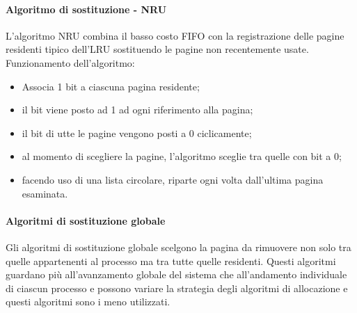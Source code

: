 \documentclass[12pt, letterpaper]{report}
\begin{document}
	\paragraph{Algoritmo di sostituzione - NRU} L'algoritmo NRU combina il basso costo FIFO con la registrazione delle pagine residenti tipico dell'LRU sostituendo le pagine non recentemente usate. \\
	Funzionamento dell'algoritmo:
	\begin{itemize}
		\item Associa 1 bit a ciascuna pagina residente;
		\item il bit viene posto ad 1 ad ogni riferimento alla pagina;
		\item il bit di utte le pagine vengono posti a 0 ciclicamente;
		\item al momento di scegliere la pagine, l'algoritmo sceglie tra quelle con bit a 0;
		\item facendo uso di una lista circolare, riparte ogni volta dall'ultima pagina esaminata.
	\end{itemize}
	\paragraph{Algoritmi di sostituzione globale} Gli algoritmi di sostituzione globale scelgono la pagina da rimuovere non solo tra quelle appartenenti al processo ma tra tutte quelle residenti. Questi algoritmi guardano più all'avanzamento globale del sistema che all'andamento individuale di ciascun processo e possono variare la strategia degli algoritmi di allocazione e questi algoritmi sono i meno utilizzati.
\end{document}
